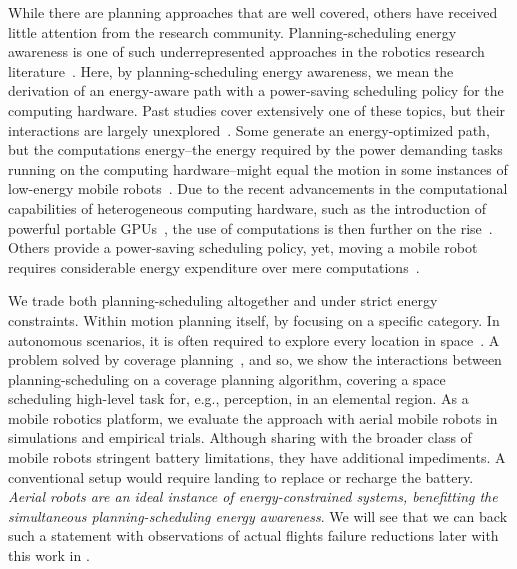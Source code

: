 While there are planning approaches that are well covered, others have received little attention from the research community. Planning-scheduling energy awareness is one of such underrepresented approaches in the robotics research literature~\citep{sudhakar2020balancing,lahijanian2018resource,ondruska2015scheduled,brateman2006energy}. Here, by planning-scheduling energy awareness, we mean the derivation of an energy-aware path with a power-saving scheduling policy for the computing hardware. Past studies cover extensively one of these topics, but their interactions are largely unexplored~\citep{brateman2006energy}. Some generate an energy-optimized path, but the computations energy--the energy required by the power demanding tasks running on the computing hardware--might equal the motion in some instances of low-energy mobile robots~\citep{sudhakar2020balancing}. Due to the recent advancements in the computational capabilities of heterogeneous computing hardware, such as the introduction of powerful portable GPUs~\citep{rizvi2017general}, the use of computations is then further on the rise~\citep{abramov2012real,satria2016real,jaramillo2019visual}. Others provide a power-saving scheduling policy, yet, moving a mobile robot requires considerable energy expenditure over mere computations~\citep{mei2004energy,mei2005case}.

We trade both planning-scheduling altogether and under strict energy constraints. Within motion planning itself, by focusing on a specific category. In autonomous scenarios, it is often required to explore every location in space~\citep{cao1988region,choset2000exact,arkin2001optimal,arkin2005optimal}. A problem solved by coverage planning~\citep{choset2001coverage,galceran2013survey}, and so, we show the interactions between planning-scheduling on a coverage planning algorithm, covering a space scheduling high-level task for, e.g., perception, in an elemental region. As a mobile robotics platform, we evaluate the approach with aerial mobile robots in simulations and empirical trials. Although sharing with the broader class of mobile robots stringent battery limitations, they have additional impediments. A conventional setup would require landing to replace or recharge the battery. {\itshape Aerial robots are an ideal instance of energy-constrained systems, benefitting the simultaneous planning-scheduling energy awareness}. We will see that we can back such a statement with observations of actual flights failure reductions later with this work in .

